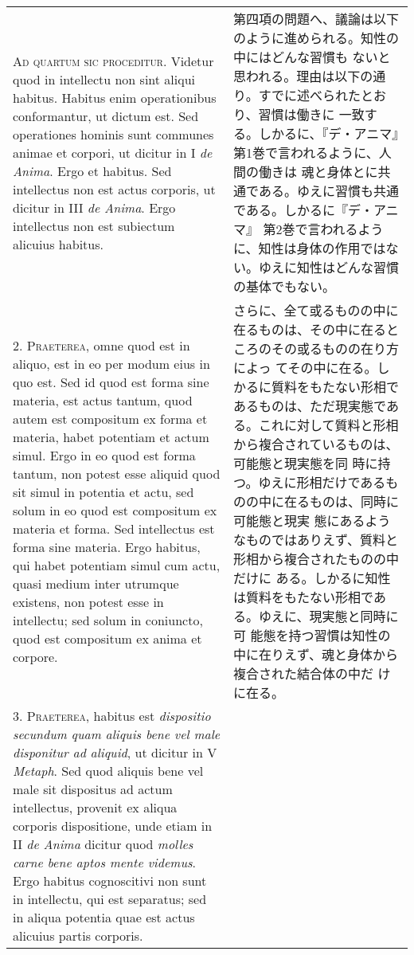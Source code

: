\documentclass[10pt]{jsarticle} %
\begin{document}
\begin{longtable}{p{21em}p{21em}}

{\scshape Ad quartum sic proceditur}. Videtur quod in intellectu non sint aliqui
 habitus. Habitus enim operationibus conformantur, ut dictum est. Sed
 operationes hominis sunt communes animae et corpori, ut dicitur in I
 {\itshape de Anima}. Ergo et habitus. Sed intellectus non est actus corporis, ut
 dicitur in III {\itshape de Anima}. Ergo intellectus non est subiectum alicuius
 habitus.


&

第四項の問題へ、議論は以下のように進められる。知性の中にはどんな習慣も
ないと思われる。理由は以下の通り。すでに述べられたとおり、習慣は働きに
一致する。しかるに、『デ・アニマ』第1巻で言われるように、人間の働きは
魂と身体とに共通である。ゆえに習慣も共通である。しかるに『デ・アニマ』
第2巻で言われるように、知性は身体の作用ではない。ゆえに知性はどんな習慣の基体でもない。

\\




2. {\scshape Praeterea}, omne quod est in aliquo, est in eo per modum eius in quo
 est. Sed id quod est forma sine materia, est actus tantum, quod autem
 est compositum ex forma et materia, habet potentiam et actum
 simul. Ergo in eo quod est forma tantum, non potest esse aliquid quod
 sit simul in potentia et actu, sed solum in eo quod est compositum ex
 materia et forma. Sed intellectus est forma sine materia. Ergo
 habitus, qui habet potentiam simul cum actu, quasi medium inter
 utrumque existens, non potest esse in intellectu; sed solum in
 coniuncto, quod est compositum ex anima et corpore.

&

さらに、全て或るものの中に在るものは、その中に在るところのその或るものの在り方によっ
てその中に在る。しかるに質料をもたない形相であるものは、ただ現実態であ
る。これに対して質料と形相から複合されているものは、可能態と現実態を同
時に持つ。ゆえに形相だけであるものの中に在るものは、同時に可能態と現実
態にあるようなものではありえず、質料と形相から複合されたものの中だけに
ある。しかるに知性は質料をもたない形相である。ゆえに、現実態と同時に可
能態を持つ習慣は知性の中に在りえず、魂と身体から複合された結合体の中だ
けに在る。

\\




3. {\scshape Praeterea}, habitus est {\itshape dispositio secundum quam aliquis
bene vel male disponitur ad aliquid}, ut dicitur in V {\itshape Metaph}. Sed quod
aliquis bene vel male sit dispositus ad actum intellectus, provenit ex
aliqua corporis dispositione, unde etiam in II {\itshape de Anima} dicitur quod
{\itshape molles carne bene aptos mente videmus}. Ergo habitus cognoscitivi non
sunt in intellectu, qui est separatus; sed in aliqua potentia quae est
actus alicuius partis corporis.


\end{longtable}
\end{document}

